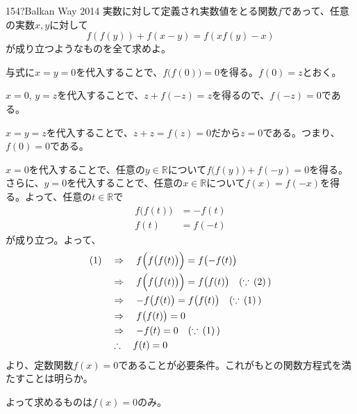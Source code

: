 \begin{thm}{154}{\hosi ?}{Balkan Way 2014}
 実数に対して定義され実数値をとる関数$f$であって、任意の実数$x, y$に対して
 \[ f\left(f(y)\right)+f(x-y)=f\left(xf(y)-x\right) \]
 が成り立つようなものを全て求めよ。
\end{thm}

与式に$x=y=0$を代入することで、$f\bigl(f(0)\bigr)=0$を得る。$f(0)=z$とおく。

$x=0$, $y=z$を代入することで、$z+f(-z)=z$を得るので、$f(-z)=0$である。

$x=y=z$を代入することで、$z+z=f(z)=0$だから$z=0$である。つまり、$f(0)=0$である。

$x=0$を代入することで、任意の$y\in\mathbb{R}$について$f\bigl(f(y)\bigr)+f(-y)=0$を得る。さらに、$y=0$を代入することで、任意の$x\in\mathbb{R}$について$f(x)=f(-x)$を得る。よって、任意の$t\in\mathbb{R}$で
\begin{align*}
 f\bigl(f(t)\bigr)&=-f(t) \\
 f(t)&=f(-t)
\end{align*}
が成り立つ。よって、
\begin{align*}
 \text{(1)} \quad &\Rightarrow \quad f\Bigl(f\bigl(f(t)\bigr)\Bigr)=f\bigl(-f(t)\bigr) \\
 &\Rightarrow \quad f\Bigl(f\bigl(f(t)\bigr)\Bigr)=f\bigl(f(t)\bigr) \quad (\because\, (2)\, )\\
 &\Rightarrow \quad -f\bigl(f(t)\bigr)=f\bigl(f(t)\bigr) \quad (\because\, (1)\, ) \\
 &\Rightarrow \quad f\bigl(f(t)\bigr)=0 \\
 &\Rightarrow \quad -f(t)=0 \quad (\because\, (1)\, ) \\
 &\therefore \quad f(t)=0
\end{align*}
より、定数関数$f(x)=0$であることが必要条件。これがもとの関数方程式を満たすことは明らか。

よって求めるものは$f(x)=0$のみ。